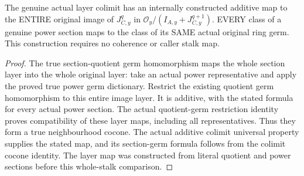 \begin{lemma}
\label{hir:real-domain-actual-normal-layer-whole-germ-map}
\leanok
The genuine actual layer colimit has an internally constructed additive
map to the ENTIRE original image of $J_{C,y}^q$ in
$\mathcal O_y/(I_{A,y}+J_{C,y}^{q+1})$. EVERY class of a genuine power
section maps to the class of its SAME actual original ring germ. This
construction requires no coherence or caller stalk map.
\end{lemma}
\begin{proof}
The true section-quotient germ homomorphism maps the whole section layer
into the whole original layer: take an actual power representative and
apply the proved true power germ dictionary. Restrict the existing
quotient germ homomorphism to this entire image layer. It is additive,
with the stated formula for every actual power section. The actual
quotient-germ restriction identity proves compatibility of these layer
maps, including all representatives. Thus they form a true neighbourhood
cocone. The actual additive colimit universal property supplies the
stated map, and its section-germ formula follows from the colimit cocone
identity. The layer map was constructed from literal quotient and power
sections before this whole-stalk comparison.
\end{proof}

